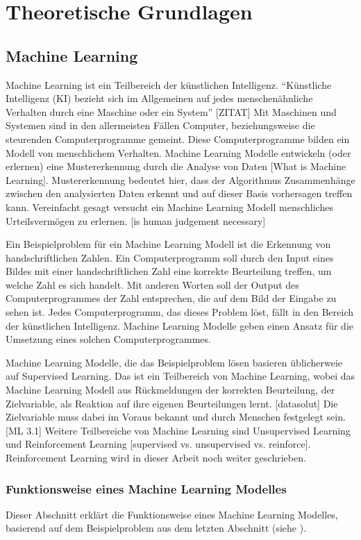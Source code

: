 \chapter{Theoretische Grundlagen}
\section{Machine Learning}
\label{chap:t_ml}
Machine Learning ist ein Teilbereich der künstlichen Intelligenz. ``Künstliche
Intelligenz (KI) bezieht sich im Allgemeinen auf jedes menschenähnliche
Verhalten durch eine Maschine oder ein System'' [ZITAT] Mit Maschinen und                
Systemen sind in den allermeisten Fällen Computer, beziehungsweise die
steurenden Computerprogramme gemeint. Diese Computerprogramme bilden ein Modell
von menschlichem Verhalten. Machine Learning Modelle entwickeln (oder erlernen)
eine Mustererkennung durch die Analyse von Daten [What is Machine Learning].
Mustererkennung bedeutet hier, dass der Algorithmus Zusammenhänge zwischen den
analysierten Daten erkennt und auf dieser Basis vorhersagen treffen kann.
Vereinfacht gesagt versucht ein Machine Learning Modell menschliches
Urteilsvermögen zu erlernen. [is human judgement necessary]

Ein Beispielproblem für ein Machine Learning Modell ist die Erkennung von
handschriftlichen Zahlen. Ein Computerprogramm soll durch den Input eines Bildes
mit einer handschriftlichen Zahl eine korrekte Beurteilung treffen, um welche
Zahl es sich handelt. Mit anderen Worten soll der Output des Computerprogrammes
der Zahl entsprechen, die auf dem Bild der Eingabe zu sehen ist. Jedes
Computerprogramm, das dieses Problem löst, fällt in den Bereich der künstlichen
Intelligenz. Machine Learning Modelle geben einen Ansatz für die Umsetzung eines
solchen Computerprogrammes.

Machine Learning Modelle, die das Beispielproblem lösen basieren üblicherweie
auf Supervised Learning. Das ist ein Teilbereich von Machine Learning, wobei das
Machine Learning Modell aus Rückmeldungen der korrekten Beurteilung, der
Zielvariable, als Reaktion auf ihre eigenen Beurteilungen lernt. [datasolut] Die
Zielvariable muss dabei im Voraus bekannt und durch Menschen festgelegt sein. [ML 3.1]
Weitere Teilbereiche von Machine Learning sind Unsupervised Learning und
Reinforcement Learning [supervised vs. unsupervised vs. reinforce].
Reinforcement Learning wird in dieser Arbeit noch weiter geschrieben.

\subsection*{Funktionsweise eines Machine Learning Modelles}
\label{sub:funktionsweise}
Dieser Abschnitt erklärt die Funktionsweise eines Machine Learning Modelles,
basierend auf dem Beispielproblem aus dem letzten Abschnitt (siehe ). 

